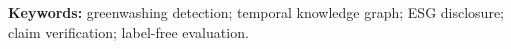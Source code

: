 \documentclass[fontsize=12pt,oneside,headings=small]{scrreprt}
\begin{document}
\vspace{0.6em}
\noindent\textbf{Keywords:} greenwashing detection; temporal knowledge graph;
ESG disclosure; claim verification; label-free evaluation.

\clearpage
{}
{}
\begin{center}
\tableofcontents
\end{center}
\thispagestyle{empty}

\clearpage
{}
{}
\begin{center}
\listoftables
\end{center}
\clearpage
{}
{}
\begin{center}
\listoffigures
\end{center}

\clearpage
\end{document}

